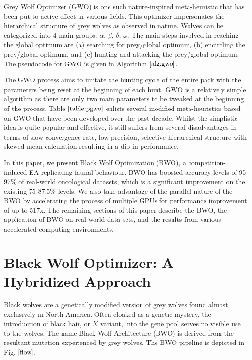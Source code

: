 \documentclass[conference]{IEEEtran}
\theoremstyle{definition}
\begin{document}
Grey Wolf Optimizer (GWO) \cite{gwo} is one such nature-inspired meta-heuristic that has been put to active effect in various fields. This optimizer impersonates the hierarchical structure of grey wolves as observed in nature. Wolves can be categorized into 4 main groups: $\alpha$, $\beta$, $\delta$, $\omega$. The main steps involved in reaching the global optimum are (a) searching for prey/global optimum, (b) encircling the prey/global optimum, and (c) hunting and attacking the prey/global optimum. The pseudocode for GWO is given in Algorithm $\ref{alg:gwo}$.

The GWO process aims to imitate the hunting cycle of the entire pack with the parameters being reset at the beginning of each hunt. GWO is a relatively simple algorithm as there are only two main parameters to be tweaked at the beginning of the process. Table $\ref{table:pgwo}$ enlists several modified meta-heuristics based on GWO that have been developed over the past decade. Whilst the simplistic idea is quite popular and effective, it still suffers from several disadvantages in terms of slow convergence rate, low precision, selective hierarchical structure with skewed mean calculation resulting in a dip in performance. 


In this paper, we present Black Wolf Optimization (BWO), a competition-induced EA replicating faunal behaviour. BWO has boosted accuracy levels of 95-97\% of real-world oncological datasets, which is a significant improvement on the existing 75-87.5\% levels. We also take advantage of the parallel nature of the BWO by accelerating the process of multiple GPUs for performance improvement of up to 517x. The remaining sections of this paper describe the BWO, the application of BWO on real-world data sets, and the results from various accelerated computing environments. 

\section{Black Wolf Optimizer: A Hybridized Approach}

Black wolves \cite{bwolf} are a genetically modified version of grey wolves found almost exclusively in North America. Often cloaked as a genetic mystery, the introduction of black hair, or $\textit{K}$ variant, into the gene pool serves no visible use to the wolves. The name Black Wolf Architecture (BWO) is derived from the resultant mutation experienced by grey wolves. The BWO pipeline is depicted in Fig. $\ref{flow}$.
\end{document}
